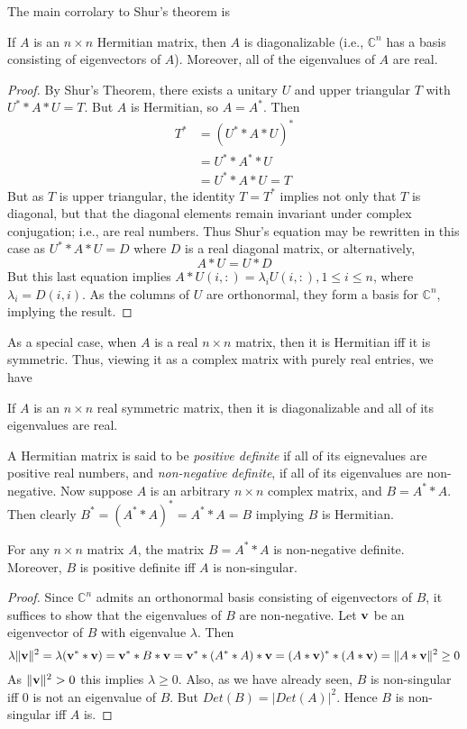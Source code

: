 \documentclass{ximera}
\begin{document}
The main corrolary to Shur's theorem is 

\begin{corollary} If $A$ is an $n\times n$ Hermitian matrix, then $A$ is diagonalizable (i.e., $\mathbb C^n$ has a basis consisting of eigenvectors of $A$). Moreover, all of the eigenvalues of $A$ are real.
\end{corollary}

\begin{proof} By Shur's Theorem, there exists a unitary $U$ and upper triangular $T$ with $U^**A*U = T$. But $A$ is Hermitian, so $A = A^*$. Then
\begin{align*}
T^* &= \left(U^**A*U\right)^*\\
        &= U^**A^**U\\
        &= U^**A*U = T
\end{align*}
But as $T$ is upper triangular, the identity $T = T^*$ implies not only that $T$ is diagonal, but that the diagonal elements remain invariant under complex conjugation; i.e., are real numbers. Thus Shur's equation may be rewritten in this case as $U^**A*U = D$ where $D$ is a real diagonal matrix, or alternatively,
\[
A*U = U*D
\]
But this last equation implies $A*U(i,:) = \lambda_i U(i,:), 1\le i\le n$, where $\lambda_i = D(i,i)$. As the columns of $U$ are orthonormal, they form a basis for $\mathbb C^n$, implying the result.
\end{proof}

As a special case, when $A$ is a real $n\times n$ matrix, then it is Hermitian iff it is symmetric. Thus, viewing it as a complex matrix with purely real entries, we have

\begin{corollary} If $A$ is an $n\times n$ real symmetric matrix, then it is diagonalizable and all of its eigenvalues are real.
\end{corollary}

A Hermitian matrix is said to be {\it positive definite} if all of its eignevalues are positive real numbers,
and {\it non-negative definite}, if all of its eigenvalues are non-negative. Now suppose $A$ is an arbitrary $n\times n$ complex matrix, and $B = A^**A$. Then clearly $B^* = (A^**A)^* = A^**A = B$ implying $B$ is Hermitian.

\begin{lemma} For any $n\times n$ matrix $A$, the matrix $B = A^**A$ is non-negative definite. Moreover, $B$ is positive definite iff $A$ is non-singular.
\end{lemma}

\begin{proof} Since $\mathbb C^n$ admits an orthonormal basis consisting of eigenvectors of $B$, it suffices to show that the eigenvalues of $B$ are non-negative. Let $\bf v$ be an eigenvector of $B$ with eigenvalue $\lambda$. Then
\[
\lambda\|{\bf v}\|^2 = \lambda({\bf v}^**{\bf v}) = {\bf v}^**B*{\bf v} = {\bf v}^**(A^**A)*{\bf v} = (A*{\bf v})^**(A*{\bf v}) = \|A*{\bf v}\|^2\ge 0
\]
As $\|{\bf v}\|^2 > 0$ this implies $\lambda\ge 0$. Also, as we have already seen, $B$ is non-singular iff $0$ is not an eigenvalue of $B$. But $Det(B) = |Det(A)|^2$. Hence $B$ is non-singular iff $A$ is.
\end{proof}
\end{document}
